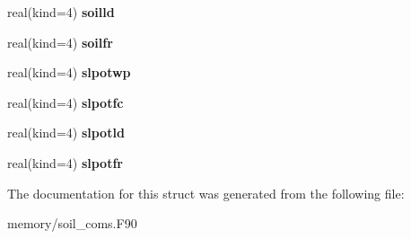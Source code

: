 \begin{DoxyCompactItemize}
\item 
\hypertarget{structsoil__coms_1_1soil__class_a2106363007b37e661042de3d39b3d584}{
real(kind=4) {\bfseries soilld}}
\label{structsoil__coms_1_1soil__class_a2106363007b37e661042de3d39b3d584}

\item 
\hypertarget{structsoil__coms_1_1soil__class_aeb0ceb4921d68cf8efdd5257baabce1e}{
real(kind=4) {\bfseries soilfr}}
\label{structsoil__coms_1_1soil__class_aeb0ceb4921d68cf8efdd5257baabce1e}

\item 
\hypertarget{structsoil__coms_1_1soil__class_ab7a36999cd5d01ac865ecdca1a1077da}{
real(kind=4) {\bfseries slpotwp}}
\label{structsoil__coms_1_1soil__class_ab7a36999cd5d01ac865ecdca1a1077da}

\item 
\hypertarget{structsoil__coms_1_1soil__class_a8ffde0aab6ba1e86a7d95a0da06af20c}{
real(kind=4) {\bfseries slpotfc}}
\label{structsoil__coms_1_1soil__class_a8ffde0aab6ba1e86a7d95a0da06af20c}

\item 
\hypertarget{structsoil__coms_1_1soil__class_a12e604bf9c67e0f6dd50d5453f68c7cd}{
real(kind=4) {\bfseries slpotld}}
\label{structsoil__coms_1_1soil__class_a12e604bf9c67e0f6dd50d5453f68c7cd}

\item 
\hypertarget{structsoil__coms_1_1soil__class_a92304babd81edfcf9cae49c239f8e4ac}{
real(kind=4) {\bfseries slpotfr}}
\label{structsoil__coms_1_1soil__class_a92304babd81edfcf9cae49c239f8e4ac}

\end{DoxyCompactItemize}


The documentation for this struct was generated from the following file:\begin{DoxyCompactItemize}
\item 
memory/soil\_\-coms.F90\end{DoxyCompactItemize}
